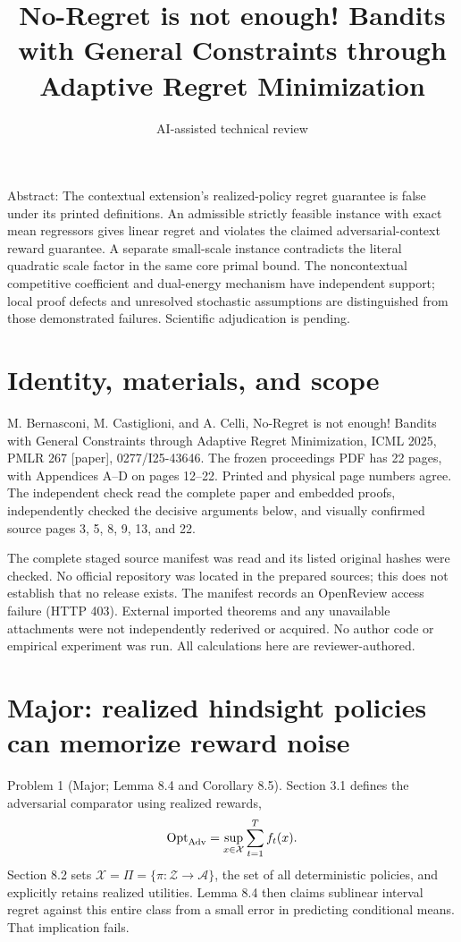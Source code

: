 \documentclass[10pt]{article}
\title{No-Regret is not enough! Bandits with General Constraints through Adaptive Regret Minimization}
\author{AI-assisted technical review}
\date{}
\begin{document}
\maketitle
Abstract: The contextual extension’s realized-policy regret guarantee is false under its printed definitions. An admissible strictly feasible instance with exact mean regressors gives linear regret and violates the claimed adversarial-context reward guarantee. A separate small-scale instance contradicts the literal quadratic scale factor in the same core primal bound. The noncontextual competitive coefficient and dual-energy mechanism have independent support; local proof defects and unresolved stochastic assumptions are distinguished from those demonstrated failures. Scientific adjudication is pending.\par
\section*{Identity, materials, and scope}
M. Bernasconi, M. Castiglioni, and A. Celli, No-Regret is not enough! Bandits with General Constraints through Adaptive Regret Minimization, ICML 2025, PMLR 267 [paper], 0277/I25-43646. The frozen proceedings PDF has 22 pages, with Appendices A–D on pages 12–22. Printed and physical page numbers agree. The independent check read the complete paper and embedded proofs, independently checked the decisive arguments below, and visually confirmed source pages 3, 5, 8, 9, 13, and 22.\par
The complete staged source manifest was read and its listed original hashes were checked. No official repository was located in the prepared sources; this does not establish that no release exists. The manifest records an OpenReview access failure (HTTP 403). External imported theorems and any unavailable attachments were not independently rederived or acquired. No author code or empirical experiment was run. All calculations here are reviewer-authored.\par
\section*{Major: realized hindsight policies can memorize reward noise}
Problem 1 (Major; Lemma 8.4 and Corollary 8.5).  Section 3.1 defines the adversarial comparator using realized rewards, \[\operatorname{Opt}_{\rm Adv}=\sup_{x\in\mathcal X}
 \sum_{t=1}^T f_t(x).\] Section 8.2 sets \(\mathcal X=\Pi=\{\pi:\mathcal Z\to\mathcal A\}\), the set of all deterministic policies, and explicitly retains realized utilities. Lemma 8.4 then claims sublinear interval regret against this entire class from a small error in predicting conditional means. That implication fails.\par
\end{document}
